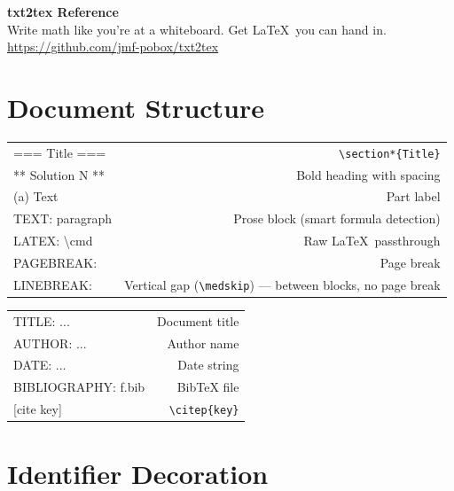 \documentclass[10pt,landscape,a4paper]{article}
\begin{document}
\begin{center}
{\LARGE\bfseries txt2tex Reference}\\[2pt]
{\small Write math like you're at a whiteboard.  Get \LaTeX\ you can hand in.}\\[1pt]
{\footnotesize\color{gray}\url{https://github.com/jmf-pobox/txt2tex}}
\end{center}

\vspace{-2pt}

\begin{multicols}{3}
\raggedcolumns

\section{Document Structure}

\begin{tabularx}{\columnwidth}{LR}
=== Title ===        & \verb|\section*{Title}| \\
** Solution N **     & Bold heading with spacing \\
(a) Text             & Part label \\
TEXT: paragraph       & Prose block (smart formula detection) \\
LATEX: \textbackslash cmd & Raw \LaTeX\ passthrough \\
PAGEBREAK:           & Page break \\
LINEBREAK:           & Vertical gap (\verb|\medskip|) — between blocks, no page break \\
\end{tabularx}

\smallskip
\begin{tabularx}{\columnwidth}{LR}
TITLE: ...           & Document title \\
AUTHOR: ...          & Author name \\
DATE: ...            & Date string \\
BIBLIOGRAPHY: f.bib  & BibTeX file \\
{[cite key]}         & \verb|\citep{key}| \\
\end{tabularx}

\section{Identifier Decoration}


\end{multicols}
\end{document}
